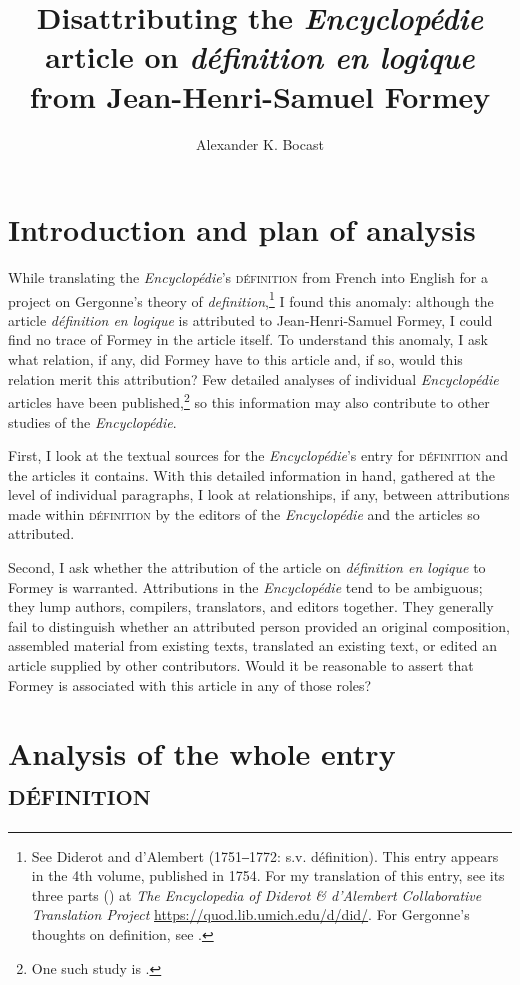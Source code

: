 \documentclass[output=paper]{langscibook}
\author{Alexander K. Bocast\affiliation{Berkeley Bridge Press, Anacortes, Washington, USA}}
\title[Disattributing Formey]
      {Disattributing the \textit{Encyclopédie} article on \textit{définition en logique} from Jean-Henri-Samuel Formey}
\begin{document}
 
\maketitle

\section{Introduction and plan of analysis}
While translating the \emph{Encyclopédie}’s \textsc{définition} from French into English for a project on Gergonne’s theory of \emph{definition},\footnote{See Diderot and d’Alembert (1751‒1772: s.v. définition). This entry appears in the 4th volume, published in 1754. For my translation of this entry, see its three parts (\citealt{Formey2016, Dalembert2016, Mallet2016}) at \emph{The Encyclopedia of Diderot \& d’Alembert Collaborative Translation Project} \url{https://quod.lib.umich.edu/d/did/}. For Gergonne’s thoughts on definition, see \citet{Gergonne1818}.}  I found this anomaly: although the article \emph{définition en logique} is attributed to Jean-Henri-Samuel Formey, I could find no trace of Formey in the article itself. To understand this anomaly, I ask what relation, if any, did Formey have to this article and, if so, would this relation merit this attribution? Few detailed analyses of individual \emph{Encyclopédie} articles have been published,\footnote{One such study is \citet{Coste2009}.}  so this information may also contribute to other studies of the \emph{Encyclopédie}.

First, I look at the textual sources for the \emph{Encyclopédie}’s entry for \textsc{définition} and the articles it contains. With this detailed information in hand, gathered at the level of individual paragraphs, I look at relationships, if any, between attributions made within \textsc{définition} by the editors of the \emph{Encyclopédie} and the articles so attributed.

Second, I ask whether the attribution of the article on \emph{définition en logique} to Formey is warranted. Attributions in the \emph{Encyclopédie} tend to be ambiguous; they lump authors, compilers, translators, and editors together. They generally fail to distinguish whether an attributed person provided an original composition, assembled material from existing texts, translated an existing text, or edited an article supplied by other contributors. Would it be reasonable to assert that Formey is associated with this article in any of those roles?

\section{Analysis of the whole entry \textsc{définition}}
\end{document}
